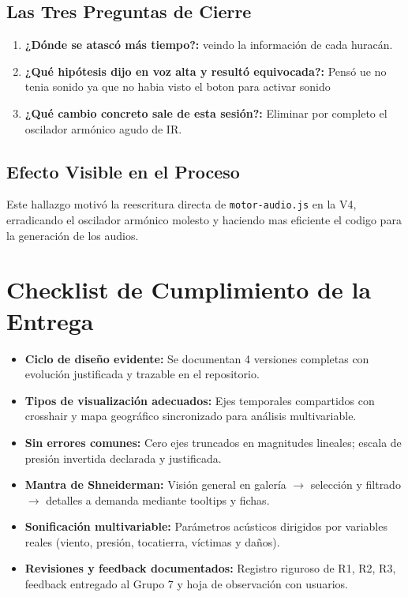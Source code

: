 \documentclass[11pt,a4paper]{article}
\begin{document}
	\subsection{Las Tres Preguntas de Cierre}
	\begin{enumerate}
		\item \textbf{¿Dónde se atascó más tiempo?:}  veindo la información de cada huracán.
		\item \textbf{¿Qué hipótesis dijo en voz alta y resultó equivocada?:} Pensó ue no tenia sonido ya que no habia visto el boton para activar sonido
		\item \textbf{¿Qué cambio concreto sale de esta sesión?:} Eliminar por completo el oscilador armónico agudo de IR.
	\end{enumerate}
	
	\subsection{Efecto Visible en el Proceso}
	Este hallazgo motivó la reescritura directa de \texttt{motor-audio.js} en la V4, erradicando el oscilador armónico molesto y haciendo mas eficiente el codigo para la generación de los audios.
	
	\vspace{0.4cm}
	
	\section{Checklist de Cumplimiento de la Entrega}
	
	\begin{metabox}
		\begin{itemize}
			\item[\checkmark] \textbf{Ciclo de diseño evidente:} Se documentan 4 versiones completas con evolución justificada y trazable en el repositorio.
			\item[\checkmark] \textbf{Tipos de visualización adecuados:} Ejes temporales compartidos con crosshair y mapa geográfico sincronizado para análisis multivariable.
			\item[\checkmark] \textbf{Sin errores comunes:} Cero ejes truncados en magnitudes lineales; escala de presión invertida declarada y justificada.
			\item[\checkmark] \textbf{Mantra de Shneiderman:} Visión general en galería $\rightarrow$ selección y filtrado $\rightarrow$ detalles a demanda mediante tooltips y fichas.
			\item[\checkmark] \textbf{Sonificación multivariable:} Parámetros acústicos dirigidos por variables reales (viento, presión, tocatierra, víctimas y daños).
			\item[\checkmark] \textbf{Revisiones y feedback documentados:} Registro riguroso de R1, R2, R3, feedback entregado al Grupo 7 y hoja de observación con usuarios.
		\end{itemize}
	\end{metabox}
	
\end{document}

